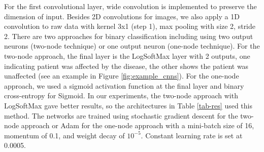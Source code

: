 \documentclass{article}
\begin{document}
For the first convolutional layer, wide convolution \cite{Kalchbrenner14aconvolutional} is implemented to preserve the dimension of input. Besides 2D convolutions for images, we also apply a 1D convolution to raw data with kernel 3x1 (step 1), max pooling with size 2, stride 2. There are two approaches for binary classification including using two output neurons (two-node technique) or one output neuron (one-node technique). For the two-node approach, the final layer is the LogSoftMax layer with 2 outputs, one indicating patient was affected by the disease, the other shows the patient was unaffected (see an example in Figure \ref{fig:example_cnns}). For the one-node approach, we used a sigmoid activation function at the final layer and binary cross-entropy for Sigmoid. In our experiments, the two-node approach with LogSoftMax gave better results, so the architectures in Table \ref{tab-res} used this method. The networks are trained using stochastic gradient descent for the two-node approach or Adam \cite{adam_alg_2014} for the one-node approach with a mini-batch size of 16, momentum of 0.1, and weight decay of $10^{-5}$. Constant learning rate is set at 0.0005. %
\end{document}
